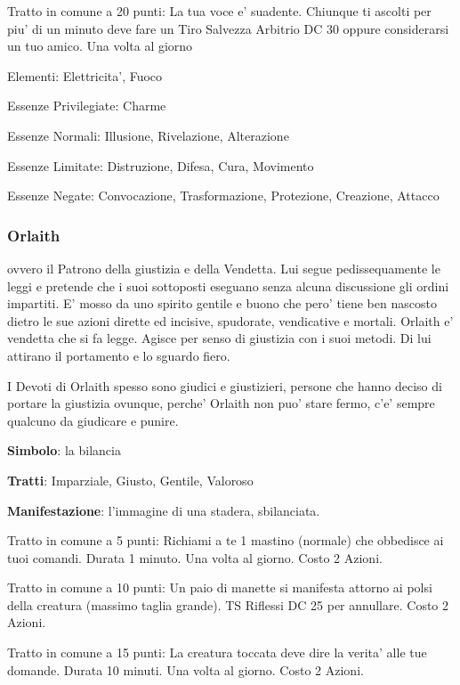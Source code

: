 \documentclass[a4paper,11pt,twoside,openany]{book}
\begin{document}
{Tratto in comune a 20 punti: La tua voce e' suadente. Chiunque ti ascolti per piu' di un minuto deve fare un Tiro Salvezza Arbitrio DC 30 oppure considerarsi un tuo amico. Una volta al giorno

\bigskip

Elementi: Elettricita', Fuoco

\bigskip

Essenze Privilegiate: Charme

Essenze Normali: Illusione, Rivelazione, Alterazione

Essenze Limitate: Distruzione, Difesa, Cura, Movimento

Essenze Negate: Convocazione, Trasformazione, Protezione, Creazione, Attacco

\subsubsection{Orlaith}

\label{orlaith}

ovvero il Patrono della giustizia e della Vendetta. Lui segue pedissequamente le leggi e pretende che i suoi sottoposti eseguano senza alcuna discussione gli ordini impartiti. E' mosso da uno spirito gentile e buono che pero' tiene ben nascosto dietro le sue azioni dirette ed incisive, spudorate, vendicative e mortali. Orlaith e' vendetta che si fa legge. Agisce per senso di giustizia con i suoi metodi. Di lui attirano il portamento e lo sguardo fiero.

I Devoti di Orlaith spesso sono giudici e giustizieri, persone che hanno deciso di portare la giustizia ovunque, perche' Orlaith non puo' stare fermo, c'e' sempre qualcuno da giudicare e punire.

\textbf{Simbolo}: la bilancia

\textbf{Tratti}: Imparziale, Giusto, Gentile, Valoroso

\textbf{Manifestazione}: l'immagine di una stadera, sbilanciata.

\bigskip

Tratto in comune a 5 punti: Richiami a te 1 mastino (normale) che obbedisce ai tuoi comandi. Durata 1 minuto. Una volta al giorno. Costo 2 Azioni.

Tratto in comune a 10 punti: Un paio di manette si manifesta attorno ai polsi della creatura (massimo taglia grande). TS Riflessi DC 25 per annullare. Costo 2 Azioni.

Tratto in comune a 15 punti: La creatura toccata deve dire la verita' alle tue domande. Durata 10 minuti. Una volta al giorno. Costo 2 Azioni.

}
\end{document}
